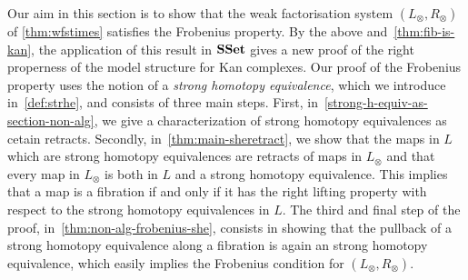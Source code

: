 \documentclass[reqno,10pt,a4paper,oneside,draft]{amsart}
\begin{document}
Our aim in this section is to show that the weak factorisation system $(L_\otimes, R_\otimes)$ of  \cref{thm:wfstimes} satisfies the Frobenius property. By the above and~\cref{thm:fib-is-kan}, the application of this result in $\mathbf{SSet}$ gives a new proof of the right properness of the model structure for Kan complexes. 
Our proof of the Frobenius property uses the notion of a \emph{strong homotopy equivalence}, which we introduce in~\cref{def:strhe}, and consists of three main steps. First, in~\cref{strong-h-equiv-as-section-non-alg}, we give a characterization of strong homotopy equivalences as cetain retracts. Secondly, in~\cref{thm:main-sheretract}, we show that the maps in $L$ which are strong homotopy
equivalences are retracts of maps in $L_\otimes$ and that every map in $L_\otimes$ is both in $L$ and a strong homotopy equivalence. This implies that a map is
a fibration if and only if it has the right lifting property with respect to the strong homotopy equivalences in $L$. The third and final step of the proof, in~\cref{thm:non-alg-frobenius-she},  consists in showing that the pullback
of a strong homotopy equivalence along a fibration is again an strong homotopy equivalence, which easily implies 
the Frobenius condition for $(L_\otimes, R_\otimes)$.
\end{document}
